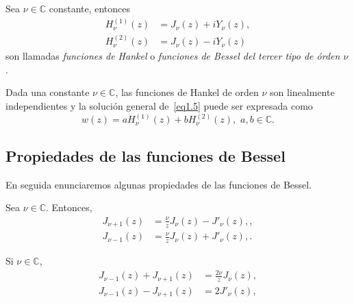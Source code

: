 \documentclass[main.tex]{subfiles}
\begin{document}
\begin{def.}\label{d1.6} %
  Sea $\nu\in\mathbb{C}$ constante, entonces
  \begin{align}
    H_{\nu}^{(1)}(z)&=J_{\nu}(z)+iY_{\nu}(z),\label{eq1.9}\\
    H_{\nu}^{(2)}(z)&=J_{\nu}(z)-iY_{\nu}(z)\label{eq1.10}
  \end{align}
  son llamadas \textit{funciones de Hankel} o \textit{funciones de Bessel del tercer tipo de órden $\nu$}.
\end{def.}
\begin{prop}\label{p1.7} %
  Dada una constante $\nu\in\mathbb{C}$, las funciones de Hankel de orden $\nu$ son linealmente independientes y la solución general de~\eqref{eq1.5} puede ser expresada como
  \[
    w(z)=aH_{\nu}^{(1)}(z)+bH_{\nu}^{(2)}(z),\,\,a,b\in\mathbb{C}.
  \]
\end{prop}
\subsection{Propiedades de las funciones de Bessel}
\noindent En seguida enunciaremos algunas propiedades de las funciones de Bessel.
\begin{prop}\label{p1.8} %
  Sea $\nu\in\mathbb{C}$. Entonces,
  \begin{align}
    J_{\nu+1}(z)&=\frac{\nu}{z}J_{\nu}(z)-J'_{\nu}(z),\label{eq1.11},\\
    J_{\nu-1}(z)&=\frac{\nu}{z}J_{\nu}(z)+J'_{\nu}(z),\label{eq1.12}.
  \end{align}
\end{prop}
\begin{cor}\label{c.12} %
  Si $\nu\in\mathbb{C}$,
  \begin{align}
    J_{\nu-1}(z)+J_{\nu+1}(z)&=\frac{2\nu}{z}J_{\nu}(z),\label{eq1.13}\\
    J_{\nu-1}(z)-J_{\nu+1}(z)&=2J'_{\nu}(z),\label{eq1.14}
  \end{align}
\end{cor}
\end{document}
